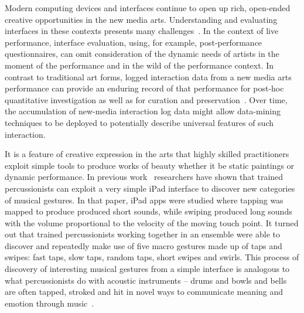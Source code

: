 \documentclass{sigchi}
\begin{document}
Modern computing devices and interfaces continue to open up rich,
open-ended creative opportunities in the new media arts. Understanding
and evaluating interfaces in these contexts presents many challenges~\cite{Resnick:2005yu,Shneiderman:2007qv}. In the context of live performance,
interface evaluation, using, for example, post-performance
questionnaires, can omit consideration of the dynamic needs of artists
in the moment of the performance and in the wild of the performance
context. In contrast to traditional art forms, logged interaction data
from a new media arts performance can provide an enduring record of
that performance for post-hoc quantitative investigation as well as
for curation and preservation~\cite{England:2014ys}. Over
time, the accumulation of new-media interaction log data might allow
data-mining techniques to be deployed to potentially describe
universal features of such interaction.



It is a feature of creative expression in the arts that highly skilled
practitioners exploit simple tools to produce works of beauty whether
it be static paintings or dynamic performance. In previous
work~\cite{Martin:2014cr} researchers have shown that trained
percussionists can exploit a very simple iPad interface to discover
new categories of musical gestures. In that paper, iPad apps were
studied where tapping was mapped to produce produced short sounds,
while swiping produced long sounds with the volume proportional to the
velocity of the moving touch point. It turned out that trained
percussionists working together in an ensemble were able to discover
and repeatedly make use of five macro gestures made up of taps and
swipes: fast taps, slow taps, random taps, short swipes and swirls.
This process of discovery of interesting musical gestures from a
simple interface is analogous to what percussionists do with acoustic
instruments -- drums and bowls and bells are often tapped, stroked and
hit in novel ways to communicate meaning and emotion through music~\cite{Schick:2006fk}.
\end{document}
